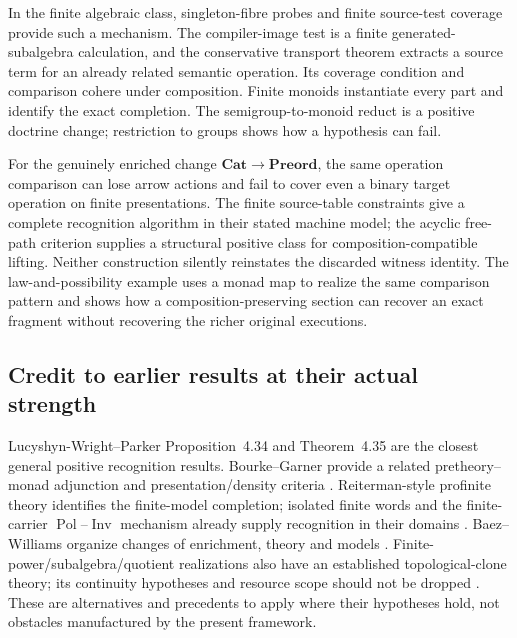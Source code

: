\documentclass[11pt]{article}
\theoremstyle{definition}
\theoremstyle{remark}
\newcommand{\Cat}{\mathbf{Cat}}
\newcommand{\Preord}{\mathbf{Preord}}
\begin{document}
In the finite algebraic class, singleton-fibre probes and finite source-test
coverage provide such a mechanism. The compiler-image test is a finite
generated-subalgebra calculation, and the conservative transport theorem
extracts a source term for an already related semantic operation. Its
coverage condition and comparison cohere under composition. Finite monoids
instantiate every part and identify the exact completion. The
semigroup-to-monoid reduct is a positive doctrine change; restriction to
groups shows how a hypothesis can fail.

For the genuinely enriched change $\Cat\to\Preord$, the same operation
comparison can lose arrow actions and fail to cover even a binary target
operation on finite presentations. The finite source-table constraints
give a complete recognition algorithm in their stated machine model; the
acyclic free-path criterion supplies a structural positive class for
composition-compatible lifting. Neither construction silently reinstates
the discarded witness identity. The law-and-possibility example uses a
monad map to realize the same comparison pattern and shows how a
composition-preserving section can recover an exact fragment without
recovering the richer original executions.

\subsection{Credit to earlier results at their actual strength}
Lucyshyn-Wright--Parker Proposition~4.34 and Theorem~4.35 are the closest
general positive recognition results. Bourke--Garner provide a related
pretheory--monad adjunction and presentation/density criteria
\cite{BourkeGarner}. Reiterman-style profinite theory identifies the
finite-model completion; isolated finite words and the finite-carrier
$\operatorname{Pol}$--$\operatorname{Inv}$ mechanism already supply
recognition in their domains \cite{ACMU,Costa,Geiger}.
Baez--Williams organize changes of enrichment, theory and models
\cite{BW}. Finite-power/subalgebra/quotient realizations also have an
established topological-clone theory; its continuity hypotheses and
resource scope should not be dropped \cite{BodirskyPinsker}.
These are alternatives and precedents to apply where their hypotheses
hold, not obstacles manufactured by the present framework.
\end{document}
